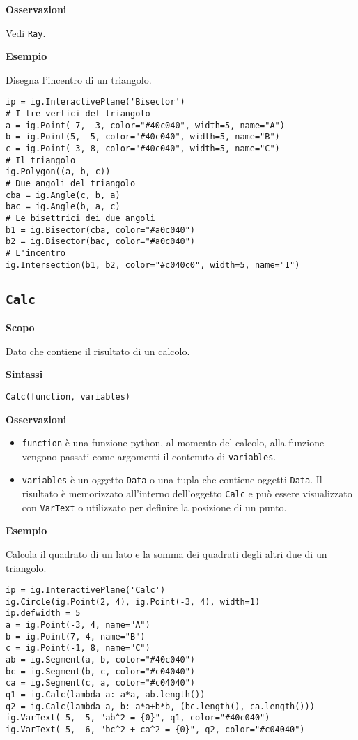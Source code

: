 \textbf{Osservazioni}

Vedi \texttt{Ray}.

\textbf{Esempio}

Disegna l'incentro di un triangolo.

\begin{lstlisting}
ip = ig.InteractivePlane('Bisector')
# I tre vertici del triangolo
a = ig.Point(-7, -3, color="#40c040", width=5, name="A")
b = ig.Point(5, -5, color="#40c040", width=5, name="B")
c = ig.Point(-3, 8, color="#40c040", width=5, name="C")
# Il triangolo
ig.Polygon((a, b, c))
# Due angoli del triangolo
cba = ig.Angle(c, b, a)
bac = ig.Angle(b, a, c)
# Le bisettrici dei due angoli
b1 = ig.Bisector(cba, color="#a0c040")
b2 = ig.Bisector(bac, color="#a0c040")
# L'incentro
ig.Intersection(b1, b2, color="#c040c0", width=5, name="I")
\end{lstlisting}


\subsection{\texttt{Calc}}
\label{sub:geoint_calc}
\textbf{Scopo}

Dato che contiene il risultato di un calcolo.

\textbf{Sintassi}

\begin{lstlisting}
Calc(function, variables)
\end{lstlisting}

\textbf{Osservazioni}
\begin{itemize} [noitemsep]
\item \texttt{function} è una funzione python, al momento del calcolo, alla
funzione vengono passati come argomenti il contenuto di \texttt{variables}.
\item \texttt{variables} è un oggetto \texttt{Data} o una tupla che contiene 
oggetti \texttt{Data}. 
Il risultato è memorizzato all'interno dell'oggetto \texttt{Calc} e può
essere visualizzato con \texttt{VarText} o utilizzato per definire la posizione
di un punto.
\end{itemize}

\textbf{Esempio}

Calcola il quadrato di un lato e la somma dei quadrati degli altri due di
un triangolo.

\begin{lstlisting}
ip = ig.InteractivePlane('Calc')
ig.Circle(ig.Point(2, 4), ig.Point(-3, 4), width=1)
ip.defwidth = 5
a = ig.Point(-3, 4, name="A")
b = ig.Point(7, 4, name="B")
c = ig.Point(-1, 8, name="C")
ab = ig.Segment(a, b, color="#40c040")
bc = ig.Segment(b, c, color="#c04040")
ca = ig.Segment(c, a, color="#c04040")
q1 = ig.Calc(lambda a: a*a, ab.length())
q2 = ig.Calc(lambda a, b: a*a+b*b, (bc.length(), ca.length()))
ig.VarText(-5, -5, "ab^2 = {0}", q1, color="#40c040")
ig.VarText(-5, -6, "bc^2 + ca^2 = {0}", q2, color="#c04040")
\end{lstlisting}

